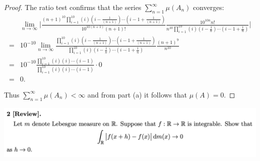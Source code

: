 \begin{enumerate}[label=(\alph*)]
\begin{proof}
  The ratio test confirms that the series $\sum_{n=1}^\infty \mu(A_n)$ converges:
  \begin{align*}
    &\lim_{n\to\infty} \Bigg|\frac{(n+1)^{10}\prod_{i=1}^{10} (i)(i -\frac{1}{(n+1)} )\cdots(i - 1 +\frac{1}{(n+1)} )}{10^{10(n+1)}(n+1)!}     \frac{10^{10n}n!}{n^{10}\prod_{i=1}^{10} (i)(i -\frac{1}{n} )\cdots(i - 1 +\frac{1}{n} )}\Bigg| \\
    = &10^{-10}\lim_{n\to\infty} \frac{\prod_{i=1}^{10} (i)(i -\frac{1}{(n+1)} )\cdots(i - 1 +\frac{1}{(n+1)} )}{\prod_{i=1}^{10} (i)(i -\frac{1}{n} )\cdots(i - 1 +\frac{1}{n} )}     \frac{(n+1)^{9}}{n^{10}} \\
    = &10^{-10}\frac{\prod_{i=1}^{10} (i)(i )\cdots(i - 1  )}{\prod_{i=1}^{10} (i)(i )\cdots(i - 1 )}   \cdot  0 \\
    = &0.
  \end{align*}

  Thus $\sum_{n=1}^\infty \mu(A_n) < \infty$ and from part (a) it follows that $\mu(A) = 0$.
\end{proof}
\end{enumerate}

\newpage
\begin{mdframed}
\includegraphics[width=400pt]{img/analysis--berkeley-202a-hw10-5e9e.png}
\end{mdframed}

